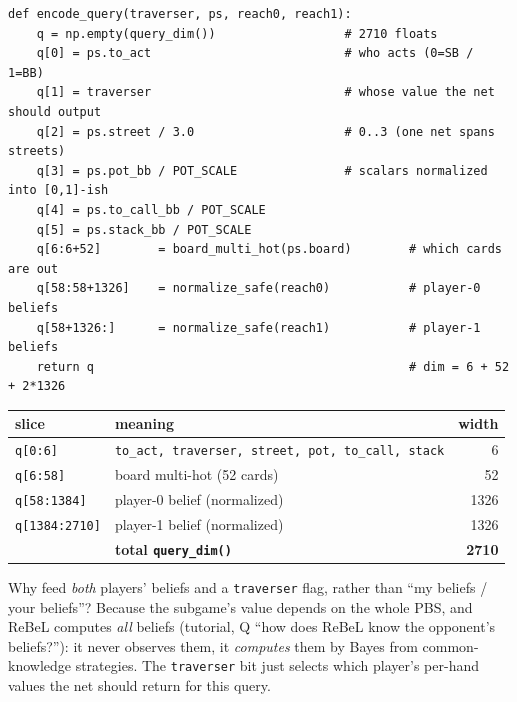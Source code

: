 \documentclass[11pt,a4paper]{article}
\newcommand{\file}[1]{\textcolor{accent}{\texttt{#1}}}
\newcommand{\fn}[1]{\texttt{#1}}
\begin{document}
\begin{lstlisting}[style=py, caption={\file{pbs.py} --- the PBS$\to$vector encoding. Two faithfulness points: beliefs are normalized to sum 1 (so the net learns value \emph{per unit opponent mass}), with the same $10^{-80}$ smoothing so an all-zero reach maps to uniform, not NaN.}]
def encode_query(traverser, ps, reach0, reach1):
    q = np.empty(query_dim())                  # 2710 floats
    q[0] = ps.to_act                           # who acts (0=SB / 1=BB)
    q[1] = traverser                           # whose value the net should output
    q[2] = ps.street / 3.0                     # 0..3 (one net spans streets)
    q[3] = ps.pot_bb / POT_SCALE               # scalars normalized into [0,1]-ish
    q[4] = ps.to_call_bb / POT_SCALE
    q[5] = ps.stack_bb / POT_SCALE
    q[6:6+52]        = board_multi_hot(ps.board)        # which cards are out
    q[58:58+1326]    = normalize_safe(reach0)           # player-0 beliefs
    q[58+1326:]      = normalize_safe(reach1)           # player-1 beliefs
    return q                                            # dim = 6 + 52 + 2*1326
\end{lstlisting}

\begin{center}\small
\begin{tabular}{@{}llr@{}}
\toprule
slice & meaning & width \\
\midrule
\texttt{q[0:6]}    & \texttt{to\_act, traverser, street, pot, to\_call, stack} & 6 \\
\texttt{q[6:58]}   & board multi-hot (52 cards)                                & 52 \\
\texttt{q[58:1384]}& player-0 belief (normalized)                              & 1326 \\
\texttt{q[1384:2710]}& player-1 belief (normalized)                            & 1326 \\
\midrule
& \textbf{total \fn{query\_dim()}} & \textbf{2710} \\
\bottomrule
\end{tabular}
\end{center}

\begin{intuition}
Why feed \emph{both} players' beliefs and a \texttt{traverser} flag, rather than
``my beliefs / your beliefs''? Because the subgame's value depends on the whole
PBS, and ReBeL computes \emph{all} beliefs (tutorial, Q ``how does ReBeL know the
opponent's beliefs?''): it never observes them, it \emph{computes} them by Bayes
from common-knowledge strategies. The \texttt{traverser} bit just selects which
player's per-hand values the net should return for this query.
\end{intuition}
\end{document}
